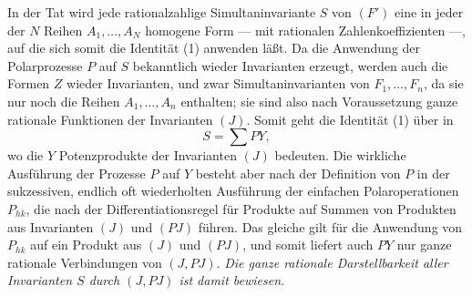 In der Tat wird jede rationalzahlige Simultaninvariante $S$ von $(F')$ eine in jeder der $N$ Reihen $A_1,\ldots,A_N$ homogene Form --- mit rationalen Zahlenkoeffizienten ---, auf die sich somit die Identität (1) anwenden läßt. Da die Anwendung der Polarprozesse $P$ auf $S$ bekanntlich wieder Invarianten erzeugt, werden auch die Formen $Z$ wieder Invarianten, und zwar Simultaninvarianten von $F_1,
\ldots,F_n$, da sie nur noch die Reihen $A_1,
\ldots,A_n$ enthalten; sie sind also nach Voraussetzung ganze rationale Funktionen der Invarianten $(J)$. Somit geht die Identität (1) über in
\[
  S=\sum PY,
\]
wo die $Y$ Potenzprodukte der Invarianten $(J)$ bedeuten. Die wirkliche Ausführung der Prozesse $P$ auf $Y$ besteht aber nach der Definition von $P$ in der sukzessiven, endlich oft wiederholten Ausführung der einfachen Polaroperationen $P_{hk}$, die nach der Differentiationsregel für Produkte auf Summen von Produkten aus Invarianten $(J)$ und $(PJ)$ führen. Das gleiche gilt für die Anwendung von $P_{hk}$ auf ein Produkt aus $(J)$ und $(PJ)$, und somit liefert auch $PY$ nur ganze rationale Verbindungen von $(J,PJ)$. \emph{Die ganze rationale Darstellbarkeit aller Invarianten $S$ durch $(J,PJ)$ ist damit bewiesen.}

